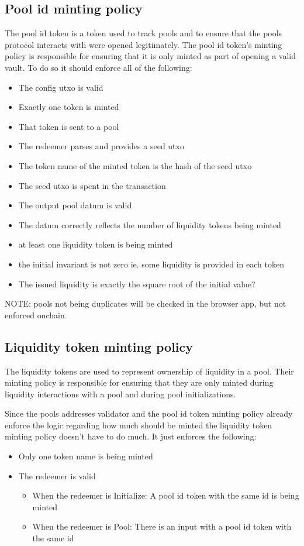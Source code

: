 \documentclass{article}
\begin{document}
\subsection{Pool id minting policy}

The pool id token is a token used to track pools
and to ensure that the pools protocol interacts with were opened legitimately.
The pool id token's minting policy is responsible for ensuring
that it is only minted as part of opening a valid vault.
To do so it should enforce all of the following:

\begin{itemize}
	\item The config utxo is valid
	\item Exactly one token is minted
	\item That token is sent to a pool
	\item The redeemer parses and provides a seed utxo
	\item The token name of the minted token is the hash of the seed utxo
	\item The seed utxo is spent in the transaction
	\item The output pool datum is valid
	\item The datum correctly reflects the number of liquidity tokens being minted
	\item at least one liquidity token is being minted
	\item the initial invariant is not zero ie. some liquidity is provided in each token
	\item The issued liquidity is exactly the square root of the initial value?
\end{itemize}

NOTE: pools not being duplicates will be checked in the browser app, but not enforced onchain.

\subsection{Liquidity token minting policy}

The liquidity tokens are used to represent ownership of liquidity in a pool.
Their minting policy is responsible for ensuring that they are only minted
during liquidity interactions with a pool and during pool initializations.

Since the pools addresses validator and the pool id token minting policy
already enforce the logic regarding how much should be minted the liquidity
token minting policy doesn't have to do much. It just enforces the following:
\begin{itemize}
	\item Only one token name is being minted
	\item The redeemer is valid
		\begin{itemize}
			\item When the redeemer is Initialize: A pool id token with the same id is being minted
			\item When the redeemer is Pool: There is an input with a pool id token with the same id
		\end{itemize}
\end{itemize}
\end{document}
